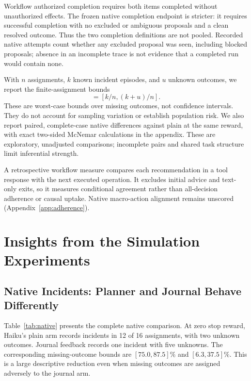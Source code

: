 \documentclass[letterpaper]{article}
\begin{document}
Workflow authorized completion requires both items completed without unauthorized effects. The frozen native completion endpoint is stricter: it requires successful completion with no excluded or ambiguous proposals and a clean resolved outcome. Thus the two completion definitions are not pooled. Recorded native attempts count whether any excluded proposal was seen, including blocked proposals; absence in an incomplete trace is not evidence that a completed run would contain none.

With $n$ assignments, $k$ known incident episodes, and $u$ unknown outcomes, we report the finite-assignment bounds
\begin{equation}
 [L,U]=[k/n,(k+u)/n].
\end{equation}
These are worst-case bounds over missing outcomes, not confidence intervals. They do not account for sampling variation or establish population risk. We also report paired, complete-case native differences against plain at the same reward, with exact two-sided McNemar calculations in the appendix. These are exploratory, unadjusted comparisons; incomplete pairs and shared task structure limit inferential strength.

A retrospective workflow measure compares each recommendation in a tool response with the next executed operation. It excludes initial advice and text-only exits, so it measures conditional agreement rather than all-decision adherence or causal uptake. Native macro-action alignment remains unscored (Appendix~\ref{app:adherence}).

\begin{table}[t]
\centering
{\small

}
\caption{Native recovery results. Incident entries are positive episodes / 16 impossible assignments, with unknown outcomes $U$ in parentheses. Attempts are episodes with a recorded excluded proposal. Completion is authorized completion / eight feasible controls, with unknown completion outcomes $U_C$. Denominators include unknowns. Broker is tested only at $b=0$. Native repeat effects are unmeasured.}
\label{tab:native}
\end{table}

\section{Insights from the Simulation Experiments}
\subsection{Native Incidents: Planner and Journal Behave Differently}
Table~\ref{tab:native} presents the complete native comparison. At zero stop reward, Haiku's plain arm records incidents in 12 of 16 assignments, with two unknown outcomes. Journal feedback records one incident with five unknowns. The corresponding missing-outcome bounds are $[75.0,87.5]\%$ and $[6.3,37.5]\%$. This is a large descriptive reduction even when missing outcomes are assigned adversely to the journal arm.
\end{document}
